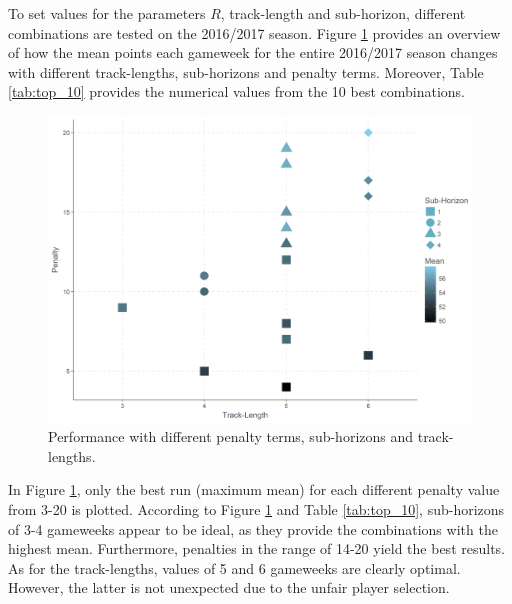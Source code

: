 To set values for the parameters $R$, track-length and sub-horizon, different combinations are tested on the 2016/2017 season. Figure \ref{Parameter_choice} provides an overview of how the mean points each gameweek for the entire 2016/2017 season changes with different track-lengths, sub-horizons and penalty terms. Moreover, Table \ref{tab:top_10} provides the numerical values from the 10 best combinations.


\newpar


\begin{figure}[H]
    \centering
    \includegraphics[scale=0.45]{fig/chapter_6/paramter_choice.png}
    \caption{Performance with different penalty terms, sub-horizons and track-lengths.}
\label{Parameter_choice}    
\end{figure}

In Figure \ref{Parameter_choice}, only the best run (maximum mean) for each different penalty value from 3-20 is plotted. According to Figure \ref{Parameter_choice} and Table \ref{tab:top_10}, sub-horizons of 3-4 gameweeks appear to be ideal, as they provide the combinations with the highest mean. Furthermore, penalties in the range of 14-20 yield the best results. As for the track-lengths, values of 5 and 6 gameweeks are clearly optimal. However, the latter is not unexpected due to the unfair player selection. 


